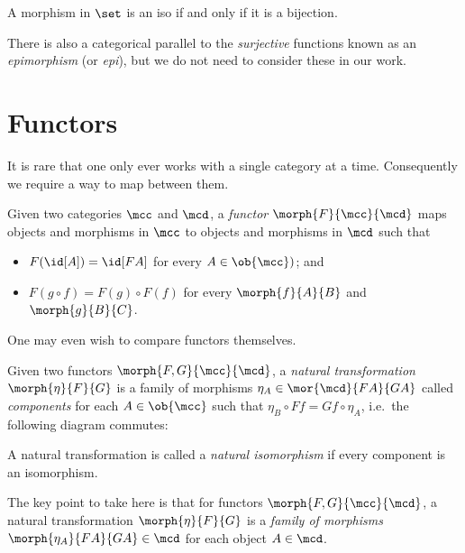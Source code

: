 \begin{example}
    A morphism in \(\set\) is an iso if and only if it is a bijection.
\end{example}

\begin{remark}
    There is also a categorical parallel to the \emph{surjective} functions
    known as an \emph{epimorphism} (or \emph{epi}), but we do not need to
    consider these in our work.
\end{remark}

\section{Functors}

It is rare that one only ever works with a single category at a time.
Consequently we require a way to map between them.

\begin{definition}[Functor]
    Given two categories \(\mcc\) and \(\mcd\), a \emph{functor} \(
        \morph{F}{\mcc}{\mcd}
    \) maps objects and morphisms in \(\mcc\) to objects and morphisms in
    \(\mcd\) such that
    \begin{itemize}
        \item \(F(\id[A]) = \id[FA]\) for every \(A \in \ob{\mcc})\); and
        \item \(F(g \circ f) = F(g) \circ F(f)\) for every \(\morph{f}{A}{B}\)
        and \(\morph{g}{B}{C}\).
    \end{itemize}
\end{definition}

One may even wish to compare functors themselves.

\begin{definition}
    Given two functors \(\morph{F, G}{\mcc}{\mcd}\), a
    \emph{natural transformation} \(\morph{\eta}{F}{G}\) is a family of
    morphisms \(
        \eta_A \in \mor{\mcd}{FA}{GA}
    \) called \emph{components} for each \(A \in \ob{\mcc}\) such that \(
        \eta_B \circ Ff = Gf \circ \eta_A
    \), i.e.\ the following diagram commutes:
    \begin{center}
        
    \end{center}
    A natural transformation is called a \emph{natural isomorphism} if
    every component is an isomorphism.
\end{definition}

The key point to take here is that for functors \(\morph{F,G}{\mcc}{\mcd}\), a
natural transformation \(\morph{\eta}{F}{G}\) is a \emph{family of morphisms}
\(\morph{\eta_A}{FA}{GA} \in \mcd\) for each object \(A \in \mcd\).

